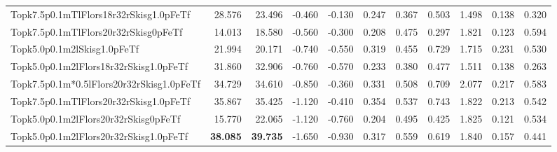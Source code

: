 \begin{tabular}{lrrrrrrrrrr}
Topk7.5p0.1mTlFlors18r32rSkisg1.0pFeTf & 28.576 & 23.496 & -0.460 & -0.130 & 0.247 & 0.367 & 0.503 & 1.498 & 0.138 & 0.320 \\
Topk7.5p0.1mTlFlors20r32rSkisg0pFeTf & 14.013 & 18.580 & -0.560 & -0.300 & 0.208 & 0.475 & 0.297 & 1.821 & 0.123 & 0.594 \\
Topk5.0p0.1m2lSkisg1.0pFeTf & 21.994 & 20.171 & -0.740 & -0.550 & 0.319 & 0.455 & 0.729 & 1.715 & 0.231 & 0.530 \\
Topk5.0p0.1m2lFlors18r32rSkisg1.0pFeTf & 31.860 & 32.906 & -0.760 & -0.570 & 0.233 & 0.380 & 0.477 & 1.511 & 0.138 & 0.263 \\
Topk7.5p0.1m*0.5lFlors20r32rSkisg1.0pFeTf & 34.729 & 34.610 & -0.850 & -0.360 & 0.331 & 0.508 & 0.709 & 2.077 & 0.217 & 0.583 \\
Topk7.5p0.1mTlFlors20r32rSkisg1.0pFeTf & 35.867 & 35.425 & -1.120 & -0.410 & 0.354 & 0.537 & 0.743 & 1.822 & 0.213 & 0.542 \\
Topk5.0p0.1m2lFlors20r32rSkisg0pFeTf & 15.770 & 22.065 & -1.120 & -0.760 & 0.204 & 0.495 & 0.425 & 1.825 & 0.121 & 0.534 \\
Topk5.0p0.1m2lFlors20r32rSkisg1.0pFeTf & \bfseries 38.085 & \bfseries 39.735 & -1.650 & -0.930 & 0.317 & 0.559 & 0.619 & 1.840 & 0.157 & 0.441 \\
\bottomrule
\end{tabular}
